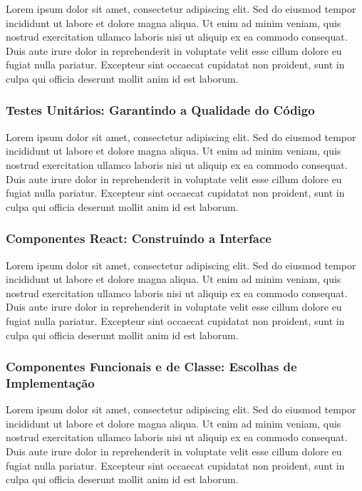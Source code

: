 \documentclass[
	12pt,				    %
	openright,			    %
	oneside,			    %
	a4paper,			    %
    sumario=tradicional,    %
	english,			    %
	brazilian,				    %
	]{abntex2}
\begin{document}
Lorem ipsum dolor sit amet, consectetur adipiscing elit. Sed do eiusmod tempor incididunt ut labore et dolore magna aliqua. Ut enim ad minim veniam, quis nostrud exercitation ullamco laboris nisi ut aliquip ex ea commodo consequat. Duis aute irure dolor in reprehenderit in voluptate velit esse cillum dolore eu fugiat nulla pariatur. Excepteur sint occaecat cupidatat non proident, sunt in culpa qui officia deserunt mollit anim id est laborum.

\subsubsection{Testes Unitários: Garantindo a Qualidade do Código}

Lorem ipsum dolor sit amet, consectetur adipiscing elit. Sed do eiusmod tempor incididunt ut labore et dolore magna aliqua. Ut enim ad minim veniam, quis nostrud exercitation ullamco laboris nisi ut aliquip ex ea commodo consequat. Duis aute irure dolor in reprehenderit in voluptate velit esse cillum dolore eu fugiat nulla pariatur. Excepteur sint occaecat cupidatat non proident, sunt in culpa qui officia deserunt mollit anim id est laborum.

\subsubsection{Componentes React: Construindo a Interface}

Lorem ipsum dolor sit amet, consectetur adipiscing elit. Sed do eiusmod tempor incididunt ut labore et dolore magna aliqua. Ut enim ad minim veniam, quis nostrud exercitation ullamco laboris nisi ut aliquip ex ea commodo consequat. Duis aute irure dolor in reprehenderit in voluptate velit esse cillum dolore eu fugiat nulla pariatur. Excepteur sint occaecat cupidatat non proident, sunt in culpa qui officia deserunt mollit anim id est laborum.

\subsubsection{Componentes Funcionais e de Classe: Escolhas de Implementação}

Lorem ipsum dolor sit amet, consectetur adipiscing elit. Sed do eiusmod tempor incididunt ut labore et dolore magna aliqua. Ut enim ad minim veniam, quis nostrud exercitation ullamco laboris nisi ut aliquip ex ea commodo consequat. Duis aute irure dolor in reprehenderit in voluptate velit esse cillum dolore eu fugiat nulla pariatur. Excepteur sint occaecat cupidatat non proident, sunt in culpa qui officia deserunt mollit anim id est laborum.
\end{document}
